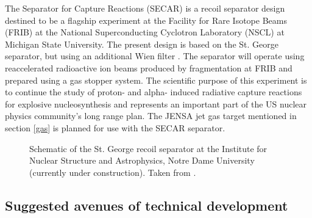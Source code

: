 The Separator for Capture Reactions (SECAR) is a recoil separator design destined to be a flagship experiment at the Facility for Rare Isotope Beams (FRIB)  at the National Superconducting Cyclotron Laboratory (NSCL) at Michigan State University. The present design is based on the St. George separator, but using an additional Wien filter \cite{ber10}. The separator will operate using reaccelerated radioactive ion beams produced by fragmentation at FRIB and prepared using a gas stopper system. The scientific purpose of this experiment is to continue the study of proton- and alpha- induced radiative capture reactions for explosive nucleosynthesis and represents an important part of the US nuclear physics community's long range plan. The JENSA jet gas target mentioned in section \ref{gas} \cite{chi13} is planned for use with the SECAR separator. 
\begin{figure}
\begin{center}
\caption{Schematic of the St. George recoil separator at the Institute for Nuclear Structure and Astrophysics, Notre Dame University (currently under construction). Taken from \cite{cou08}.}
\label{fig:stgeorge}
\end{center}
\end{figure}



\subsection{Suggested avenues of technical development} 

